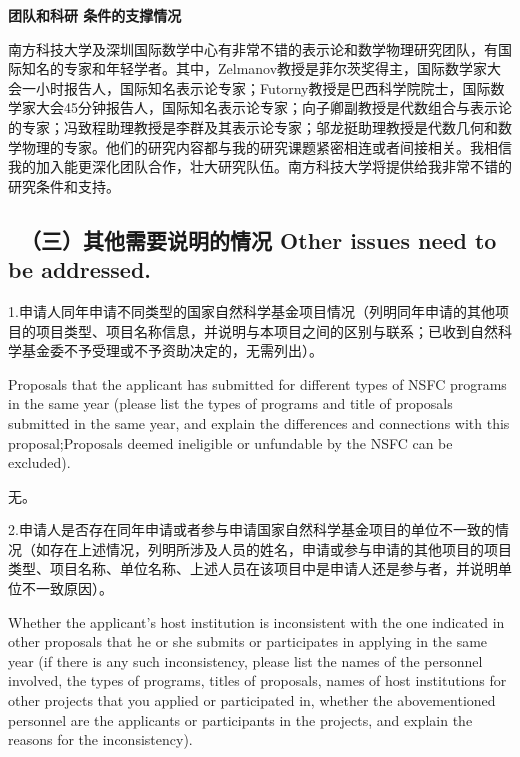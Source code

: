 \documentclass[12pt,UTF8,AutoFakeBold=4,a4paper]{ctexart}
\begin{document}
\medskip

\textbf{\sihao 团队和科研 条件的支撑情况}

南方科技大学及深圳国际数学中心有非常不错的表示论和数学物理研究团队，有国际知名的专家和年轻学者。其中，Zelmanov教授是菲尔茨奖得主，国际数学家大会一小时报告人，国际知名表示论专家；Futorny教授是巴西科学院院士，国际数学家大会45分钟报告人，国际知名表示论专家；向子卿副教授是代数组合与表示论的专家；冯致程助理教授是李群及其表示论专家；邬龙挺助理教授是代数几何和数学物理的专家。他们的研究内容都与我的研究课题紧密相连或者间接相关。我相信我的加入能更深化团队合作，壮大研究队伍。南方科技大学将提供给我非常不错的研究条件和支持。

\bigskip

{\color{MsBlue} \subsection{\sihao \kaishu \qquad \ \bfseries（三）其他需要说明的情况 
\xiaosihao {} Other issues need to be addressed.}}
%

\bigskip

{\sihao \color{MsBlue} \kaishu 1.申请人同年申请不同类型的国家自然科学基金项目情况（列明同年申请的其他项目的项目类型、项目名称信息，并说明与本项目之间的区别与联系；已收到自然科学基金委不予受理或不予资助决定的，无需列出）。}

\bigskip

{\color{MsBlue} \xiaosihao {} 
Proposals that the applicant has submitted for different types of NSFC programs in the same year (please list the types of programs and title of proposals submitted in the same year, and explain the differences and connections with this proposal;Proposals deemed ineligible or unfundable by the NSFC can be excluded).}

\bigskip

无。

\bigskip

{\sihao \color{MsBlue} \kaishu 2.申请人是否存在同年申请或者参与申请国家自然科学基金项目的单位不一致的情况（如存在上述情况，列明所涉及人员的姓名，申请或参与申请的其他项目的项目类型、项目名称、单位名称、上述人员在该项目中是申请人还是参与者，并说明单位不一致原因）。}

\bigskip

{\color{MsBlue} \xiaosihao {} 
Whether the applicant's host institution is inconsistent with the one indicated in other proposals that he or she submits or participates in applying in the same year (if there is any such inconsistency, please list the names of the personnel involved, the types of programs, titles of proposals, names of host institutions for other projects that you applied or participated in, whether the abovementioned personnel are the applicants or participants in the projects, and explain the reasons for the inconsistency).}
\end{document}

